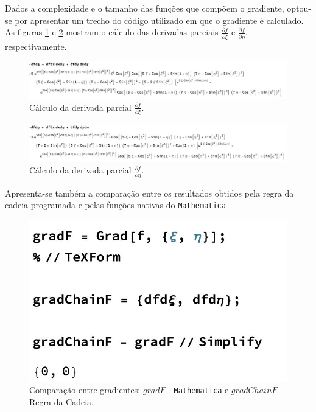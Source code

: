 Dados a complexidade e o tamanho das fun\c{c}\~oes que comp\~oem o gradiente, optou-se por apresentar um trecho do c\'odigo utilizado em que o gradiente \'e calculado. As figuras \ref{fig:dfdxi} e \ref{fig:dfdeta} mostram o c\'alculo das derivadas parciais $\frac{\partial f}{\partial \xi}$ e $\frac{\partial f}{\partial \eta}$, respectivamente.

\begin{figure}[H]
    \centering
    \includegraphics[scale=.38]{Figures/Ex3dfdxi.jpeg}
    \caption{C\'alculo da derivada parcial $\frac{\partial f}{\partial \xi}$.}
    \label{fig:dfdxi}
\end{figure}

\begin{figure}[H]
    \centering
    \includegraphics[scale=.38]{Figures/Ex3dfdeta.jpeg}
    \caption{C\'alculo da derivada parcial $\frac{\partial f}{\partial \eta}$.}
    \label{fig:dfdeta}
\end{figure}

Apresenta-se tamb\'em a compara\c{c}\~ao entre os resultados obtidos pela regra da cadeia programada e pelas fun\c{c}\~oes nativas do \texttt{Mathematica}

\begin{figure}[H]
    \centering
    \includegraphics[scale=.22]{Figures/Ex3Comparison.jpeg}
    \caption{Compara\c{c}\~ao entre gradientes: $gradF$ - \texttt{Mathematica} e $gradChainF$ - Regra da Cadeia.}
    \label{fig:gradf}
\end{figure}

